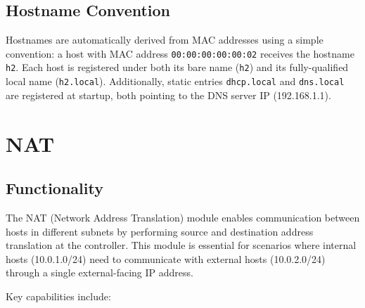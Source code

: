 \documentclass[12pt,a4paper]{article}
\begin{document}
\subsection{Hostname Convention}

Hostnames are automatically derived from MAC addresses using a simple convention: a host with MAC address \texttt{00:00:00:00:00:02} receives the hostname \texttt{h2}. Each host is registered under both its bare name (\texttt{h2}) and its fully-qualified local name (\texttt{h2.local}). Additionally, static entries \texttt{dhcp.local} and \texttt{dns.local} are registered at startup, both pointing to the DNS server IP (192.168.1.1).

\section{NAT}

\subsection{Functionality}

The NAT (Network Address Translation) module enables communication between hosts in different subnets by performing source and destination address translation at the controller. This module is essential for scenarios where internal hosts (10.0.1.0/24) need to communicate with external hosts (10.0.2.0/24) through a single external-facing IP address.

Key capabilities include:
\end{document}
